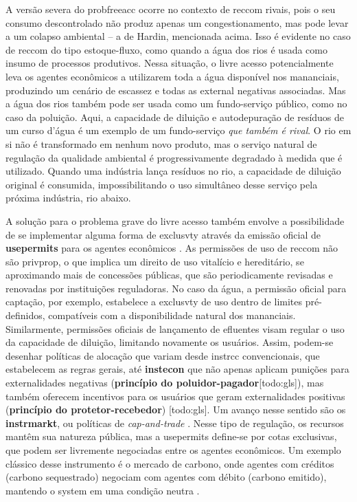 \documentclass[./main.tex]{subfiles}
\begin{document}
\par A versão severa do \gls{probfreeacc} ocorre no contexto de \gls{reccom} rivais, pois o seu consumo descontrolado não produz apenas um congestionamento, mas pode levar a um colapso ambiental -- a  de Hardin, mencionada acima. Isso é evidente no caso de \gls{reccom} do tipo estoque-fluxo, como quando a água dos rios é usada como insumo de processos produtivos. Nessa situação, o livre acesso potencialmente leva os agentes econômicos a utilizarem toda a água disponível nos mananciais, produzindo um cenário de escassez e todas as \gls{external} negativas associadas. Mas a água dos rios também pode ser usada como um fundo-serviço público, como no caso da poluição. Aqui, a capacidade de diluição e autodepuração de resíduos de um curso d'água é um exemplo de um fundo-serviço \textit{que também é rival}. O rio em si não é transformado em nenhum novo produto, mas o serviço natural de regulação da qualidade ambiental é progressivamente degradado à medida que é utilizado. Quando uma indústria lança resíduos no rio, a capacidade de diluição original é consumida, impossibilitando o uso simultâneo desse serviço pela próxima indústria, rio abaixo. 

\par A solução para o problema grave do livre acesso também envolve a possibilidade de se implementar alguma forma de \gls{exclusvty} através da emissão oficial de \textbf{\gls{usepermits}} para os agentes econômicos \cite{Schlager1992}. As permissões de uso de \gls{reccom} não são \gls{privprop}, o que implica um direito de uso vitalício e hereditário, se aproximando mais de concessões públicas, que são periodicamente revisadas e renovadas por instituições reguladoras. No caso da água, a permissão oficial para captação, por exemplo, estabelece a \gls{exclusvty} de uso dentro de limites pré-definidos, compatíveis com a disponibilidade natural dos mananciais. Similarmente, permissões oficiais de lançamento de efluentes visam regular o uso da capacidade de diluição, limitando novamente os usuários. Assim, podem-se desenhar políticas de alocação que variam desde \gls{instrcc} convencionais, que estabelecem as regras gerais, até \textbf{\gls{instecon}} que não apenas aplicam punições para externalidades negativas (\textbf{princípio do poluidor-pagador}[todo:gls]), mas também oferecem incentivos para os usuários que geram externalidades positivas (\textbf{princípio do protetor-recebedor}) [todo:gls]. Um avanço nesse sentido são os \textbf{\gls{instrmarkt}}, ou políticas de \textit{cap-and-trade} \cite{Borghesi2013}. Nesse tipo de regulação, os recursos mantêm sua natureza pública, mas a \gls{usepermits} define-se por cotas exclusivas, que podem ser livremente negociadas entre os agentes econômicos. Um exemplo clássico desse instrumento é o mercado de carbono, onde agentes com créditos (carbono sequestrado) negociam com agentes com débito (carbono emitido), mantendo o \gls{system} em uma condição neutra \cite{Mazaheri2022}.
\end{document}
